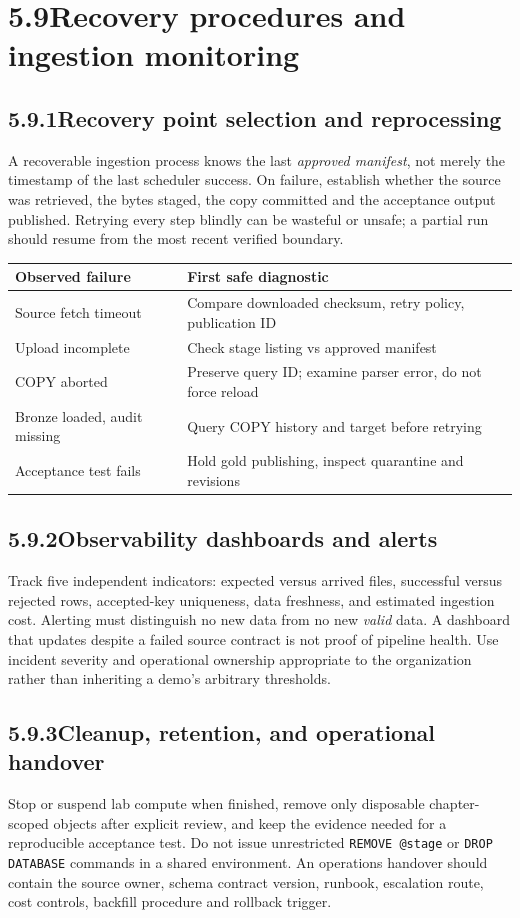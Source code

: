 \documentclass[11pt,twoside]{article}
\newcommand{\topic}[2]{\subsection*{#1\quad #2}}
\begin{document}
\section*{5.9\quad Recovery procedures and ingestion monitoring}
\topic{5.9.1}{Recovery point selection and reprocessing}
A recoverable ingestion process knows the last \emph{approved manifest}, not merely the timestamp of the last scheduler success. On failure, establish whether the source was retrieved, the bytes staged, the copy committed and the acceptance output published. Retrying every step blindly can be wasteful or unsafe; a partial run should resume from the most recent verified boundary.

\begin{center}\small\begin{tabularx}{\linewidth}{@{}p{34mm}X@{}}\toprule
Observed failure & First safe diagnostic\\\midrule
Source fetch timeout & Compare downloaded checksum, retry policy, publication ID\\
Upload incomplete & Check stage listing vs approved manifest\\
COPY aborted & Preserve query ID; examine parser error, do not force reload\\
Bronze loaded, audit missing & Query COPY history and target before retrying\\
Acceptance test fails & Hold gold publishing, inspect quarantine and revisions\\\bottomrule\end{tabularx}\end{center}
\topic{5.9.2}{Observability dashboards and alerts}
Track five independent indicators: expected versus arrived files, successful versus rejected rows, accepted-key uniqueness, data freshness, and estimated ingestion cost. Alerting must distinguish no new data from no new \emph{valid} data. A dashboard that updates despite a failed source contract is not proof of pipeline health. Use incident severity and operational ownership appropriate to the organization rather than inheriting a demo's arbitrary thresholds.

\topic{5.9.3}{Cleanup, retention, and operational handover}
Stop or suspend lab compute when finished, remove only disposable chapter-scoped objects after explicit review, and keep the evidence needed for a reproducible acceptance test. Do not issue unrestricted \texttt{REMOVE @stage} or \texttt{DROP DATABASE} commands in a shared environment. An operations handover should contain the source owner, schema contract version, runbook, escalation route, cost controls, backfill procedure and rollback trigger.
\end{document}
